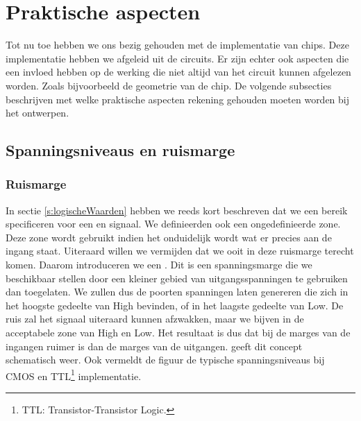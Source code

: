 \section{Praktische aspecten}
Tot nu toe hebben we ons bezig gehouden met de implementatie van chips. Deze implementatie hebben we afgeleid uit de circuits. Er zijn echter ook aspecten die een invloed hebben op de werking die niet altijd van het circuit kunnen afgelezen worden. Zoals bijvoorbeeld de geometrie van de chip. De volgende subsecties beschrijven met welke praktische aspecten rekening gehouden moeten worden bij het ontwerpen.
\subsection{Spanningsniveaus en ruismarge}
\subsubsection{Ruismarge}
In sectie \ref{s:logischeWaarden} hebben we reeds kort beschreven dat we een bereik specificeren voor een  en  signaal.  We definieerden ook een ongedefinieerde zone. Deze zone wordt gebruikt indien het onduidelijk wordt wat er precies aan de ingang staat. Uiteraard willen we vermijden dat we ooit in deze ruismarge terecht komen. Daarom introduceren we een . Dit is een spanningsmarge die we beschikbaar stellen door een kleiner gebied van uitgangsspanningen te gebruiken dan toegelaten. We zullen dus de poorten spanningen laten genereren die zich in het hoogste gedeelte van High bevinden, of in het laagste gedeelte van Low. De ruis zal het signaal uiteraard kunnen afzwakken, maar we bijven in de acceptabele zone van High en Low. Het resultaat is dus dat bij de marges van de ingangen ruimer is dan de marges van de uitgangen.  geeft dit concept schematisch weer. Ook vermeldt de figuur de typische spanningsniveaus bij CMOS en TTL\footnote{TTL: Transistor-Transistor Logic.} implementatie.
